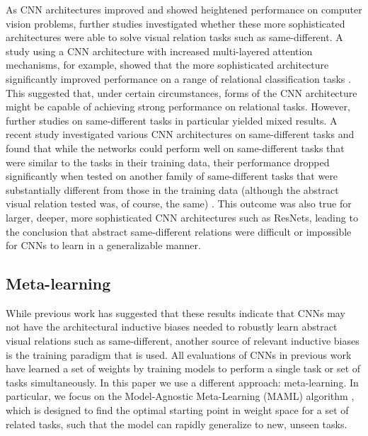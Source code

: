 \documentclass[10pt,letterpaper]{article}
\begin{document}
As CNN architectures improved and showed heightened performance on computer vision problems, further studies investigated whether these more sophisticated architectures were able to solve visual relation tasks such as same-different. A study using a CNN architecture with increased multi-layered attention mechanisms, for example, showed that the more sophisticated architecture significantly improved performance on a range of relational classification tasks \cite{wang2016relation}. This suggested that, under certain circumstances, forms of the CNN architecture might be capable of achieving strong performance on relational tasks. However, further studies on same-different tasks in particular yielded mixed results. A recent study investigated various CNN architectures on same-different tasks and found that while the networks could perform well on same-different tasks that were similar to the tasks in their training data, their performance dropped significantly when tested on another family of same-different tasks that were substantially different from those in the training data (although the abstract visual relation tested was, of course, the same) \cite{puebla2022can}. This outcome was also true for larger, deeper, more sophisticated CNN architectures such as ResNets, leading to the conclusion that abstract same-different relations were difficult or impossible for CNNs to learn in a generalizable manner. 

\subsection{Meta-learning}
While previous work has suggested that these  results indicate that CNNs may not have the architectural inductive biases needed to robustly learn abstract visual relations such as same-different, another source of  relevant inductive biases is the training paradigm that is used. All evaluations of CNNs in previous work have learned a set of weights by training models to perform a single task or set of tasks simultaneously. In this paper we use a different approach: meta-learning. In particular, we focus on the Model-Agnostic Meta-Learning (MAML) algorithm \cite{finn2017model}, which is designed to find the optimal starting point in weight space for a set of related tasks, such that the model can rapidly generalize to new, unseen tasks. 

\end{document}
